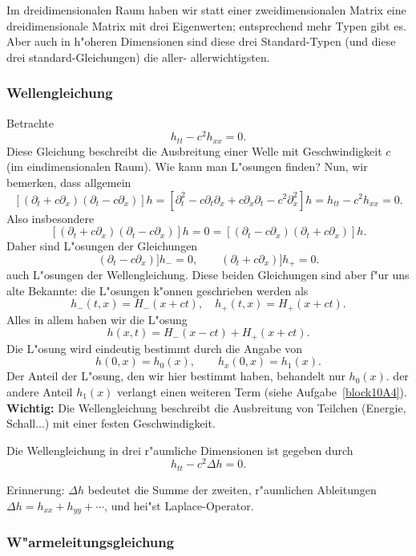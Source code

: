 Im dreidimensionalen Raum haben wir statt einer zweidimensionalen Matrix eine 
dreidimensionale Matrix mit drei Eigenwerten; entsprechend mehr Typen gibt es.
Aber auch in h"oheren Dimensionen sind diese drei Standard-Typen (und diese 
drei standard-Gleichungen) die aller- allerwichtigsten.

\subsubsection{Wellengleichung}
Betrachte
$$ h_{tt}-c^2h_{xx} = 0.$$
Diese Gleichung beschreibt die Ausbreitung einer Welle mit Geschwindigkeit $c$ 
(im eindimensionalen Raum). Wie kann man L"osungen finden? Nun, wir bemerken, dass allgemein
$$
[ (\partial_t+c\partial_x) (\partial_t-c\partial_x) ]h
= 
[\partial_t^2-c\partial_t \partial_x+c\partial_x \partial_t - c^2 \partial_x^2]h
=  h_{tt}-c^2h_{xx} = 0.
$$
Also insbesondere
$$
[ (\partial_t+c\partial_x) (\partial_t-c\partial_x) ]h
= 0 = 
[ (\partial_t-c\partial_x) (\partial_t+c\partial_x) ]h.
$$
Daher sind  L"osungen der Gleichungen
$$ 
(\partial_t-c\partial_x) ]h_- = 0,\qquad
(\partial_t+c\partial_x) ]h_+ = 0.
$$
auch L"osungen der Wellengleichung. Diese beiden Gleichungen sind aber 
f"ur uns alte Bekannte: die L"osungen k"onnen geschrieben werden als
$$ h_-(t,x) = H_-(x+ct),\quad h_+(t,x) = H_+(x+ct).$$
Alles in allem haben wir die L"osung
$$ h(x,t) = H_-(x-ct)+H_+(x+ct).$$
Die L"osung wird eindeutig bestimmt durch die Angabe von
$$ h(0,x) = h_0(x),\qquad h_x(0,x) = h_1(x).$$
Der Anteil der L"osung, den wir hier bestimmt haben, 
behandelt nur $h_0(x)$. der andere Anteil $h_1(x)$ verlangt einen
weiteren Term (siehe Aufgabe~\ref{block10A4}).  
{\bf Wichtig: } Die Wellengleichung beschreibt die Ausbreitung von Teilchen 
(Energie, Schall...) mit einer festen Geschwindigkeit.
\begin{sdefi}
Die Wellengleichung in drei r"aumliche Dimensionen ist gegeben durch
$$ h_{tt} - c^2\Delta h = 0.$$
\end{sdefi}
Erinnerung: $\Delta h$ bedeutet die Summe der zweiten, r"aumlichen Ableitungen
$\Delta h = h_{xx}+h_{yy}+\cdots$, und hei"st Laplace-Operator.

\subsubsection{W"armeleitungsgleichung}

